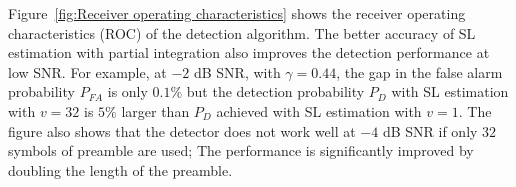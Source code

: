 
Figure~\ref{fig:Receiver operating characteristics} shows the receiver
operating characteristics (ROC) of the detection algorithm. 
The better accuracy of SL estimation with partial integration also
improves the detection performance  at low SNR.
For example,
at $-2$ dB SNR, with $\gamma=0.44$, the gap in the false alarm
probability $P_{FA}$ is only $0.1\%$
but the detection probability $P_{D}$ with SL estimation with $v{=}32$
is $5\%$ larger than $P_D$ achieved with SL estimation with $v{=}1$. 
The figure also shows that the detector does not work well at $-4$ dB SNR if only $32$ symbols of preamble are used;  
The performance is significantly improved by doubling the length of
the preamble.
